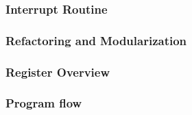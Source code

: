 \subsubsection{Interrupt Routine}

\subsubsection{Refactoring and Modularization}

\subsubsection{Register Overview}



\subsubsection{Program flow}



